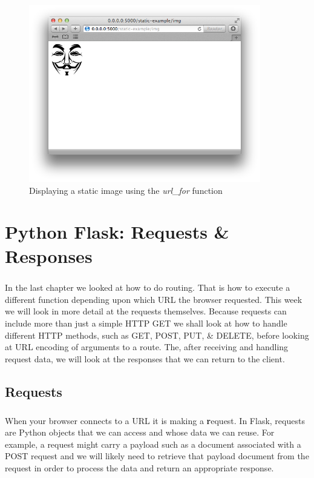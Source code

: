 \documentclass[12pt, a4paper, twoside]{book}
\begin{document}
\begin{figure}[H]
\centering
\includegraphics[width=0.9\textwidth]{images/flask-static-img.png}
\caption{Displaying a static image using the \emph{url\_for} function}
\label{fig:flask-static-img}
\end{figure}



\chapter{Python Flask: Requests \& Responses}
\label{lab04}
\paragraph{} In the last chapter we looked at how to do routing. That is how to execute a different function depending upon which URL the browser requested. This week we will look in more detail at the requests themselves. Because requests can include more than just a simple HTTP GET we shall look at how to handle different HTTP methods, such as GET, POST, PUT, \& DELETE, before looking at URL encoding of arguments to a route. The, after receiving and handling request data, we will look at the responses that we can return to the client.


\section{Requests}
\label{requests}
\paragraph{} When your browser connects to a URL it is making a {\textbf request}. In Flask, requests are Python objects that we can access and whose data we can reuse. For example, a request might carry a payload such as a document associated with a POST request and we will likely need to retrieve that payload document from the request in order to process the data and return an appropriate response.
\end{document}
